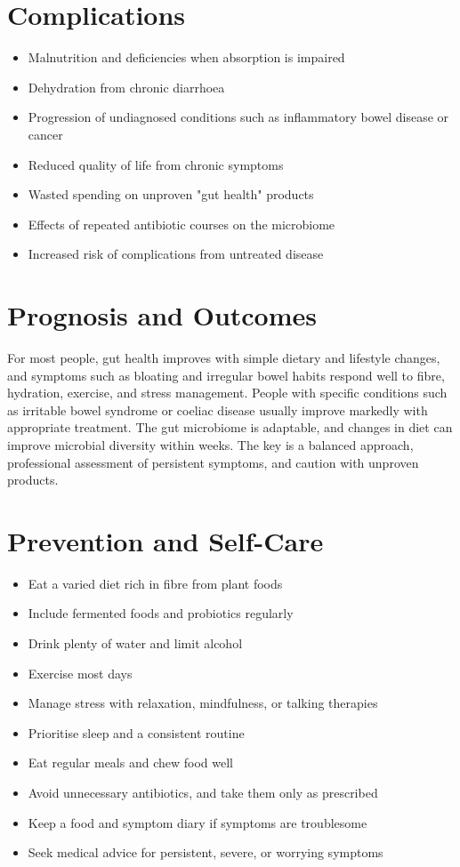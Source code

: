 \section*{Complications}
\begin{itemize}
    \item Malnutrition and deficiencies when absorption is impaired
    \item Dehydration from chronic diarrhoea
    \item Progression of undiagnosed conditions such as inflammatory bowel disease or cancer
    \item Reduced quality of life from chronic symptoms
    \item Wasted spending on unproven "gut health" products
    \item Effects of repeated antibiotic courses on the microbiome
    \item Increased risk of complications from untreated disease
\end{itemize}

\section*{Prognosis and Outcomes}
For most people, gut health improves with simple dietary and lifestyle changes, and symptoms such as bloating and irregular bowel habits respond well to fibre, hydration, exercise, and stress management. People with specific conditions such as irritable bowel syndrome or coeliac disease usually improve markedly with appropriate treatment. The gut microbiome is adaptable, and changes in diet can improve microbial diversity within weeks. The key is a balanced approach, professional assessment of persistent symptoms, and caution with unproven products.

\section*{Prevention and Self-Care}
\begin{itemize}
    \item Eat a varied diet rich in fibre from plant foods
    \item Include fermented foods and probiotics regularly
    \item Drink plenty of water and limit alcohol
    \item Exercise most days
    \item Manage stress with relaxation, mindfulness, or talking therapies
    \item Prioritise sleep and a consistent routine
    \item Eat regular meals and chew food well
    \item Avoid unnecessary antibiotics, and take them only as prescribed
    \item Keep a food and symptom diary if symptoms are troublesome
    \item Seek medical advice for persistent, severe, or worrying symptoms
\end{itemize}

